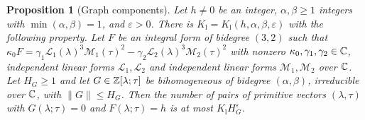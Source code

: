 \documentclass[11pt,reqno]{amsart}
\newtheorem{proposition}[theorem]{Proposition}
\theoremstyle{definition}
\theoremstyle{remark}
\numberwithin{equation}{section}
\newcommand{\eps}{\varepsilon}\newcommand{\card}{\#}
\begin{document}
\begin{proposition}[Graph components]\label{prop:low}
Let $h\ne0$ be an integer, $\alpha,\beta\ge1$ integers with
$\min(\alpha,\beta)=1$, and $\eps>0$. There is $K_{\mathrm l}=K_{\mathrm l}(h,\alpha,\beta,\eps)$
with the following property. Let $F$ be an integral form of bidegree
$(3,2)$ such that $\kappa_0F=\gamma_1\mathcal L_1(\lambda)^3\mathcal M_1(\tau)^2
-\gamma_2\mathcal L_2(\lambda)^3\mathcal M_2(\tau)^2$ with nonzero
$\kappa_0,\gamma_1,\gamma_2\in\mathbb C$, independent linear forms $\mathcal L_1,\mathcal L_2$ and
independent linear forms $\mathcal M_1,\mathcal M_2$ over $\mathbb C$. Let $H_G\ge1$ and let
$G\in\mathbb Z[\lambda;\tau]$ be bihomogeneous of bidegree $(\alpha,\beta)$,
irreducible over $\mathbb C$, with $\|G\|\le H_G$. Then the number of pairs of
primitive vectors $(\lambda,\tau)$ with $G(\lambda;\tau)=0$ and
$F(\lambda;\tau)=h$ is at most $K_{\mathrm l}H_G^{\eps}$.
\end{proposition}
\end{document}
